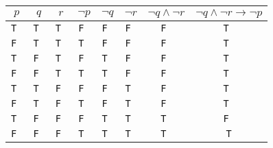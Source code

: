 \documentclass[a4paper,11pt]{article}
\begin{document}
\begin{description}
\begin{tabular}{c|c|c|c|c|c|c|c}
$p$   & $q$   & $r$   & $\neg p$ & $\neg q$ & $\neg r$ & $\neg q \wedge \neg r$ & $\neg q \wedge \neg r \rightarrow \neg p$\\
\hline
\tt T & \tt T & \tt T & \tt F    & \tt F    & \tt F    & \tt F                  & \tt T \\
\tt F & \tt T & \tt T & \tt T    & \tt F    & \tt F    & \tt F                  & \tt T \\
\tt T & \tt F & \tt T & \tt F    & \tt T    & \tt F    & \tt F                  & \tt T \\
\tt F & \tt F & \tt T & \tt T    & \tt T    & \tt F    & \tt F                  & \tt T \\
\tt T & \tt T & \tt F & \tt F    & \tt F    & \tt T    & \tt F                  & \tt T \\
\tt F & \tt T & \tt F & \tt T    & \tt F    & \tt T    & \tt F                  & \tt T \\
\tt T & \tt F & \tt F & \tt F    & \tt T    & \tt T    & \tt T                  & \tt F \\
\tt F & \tt F & \tt F & \tt T    & \tt T    & \tt T    & \tt T                  & \tt T
\end{tabular}

\end{description}
\end{document}
